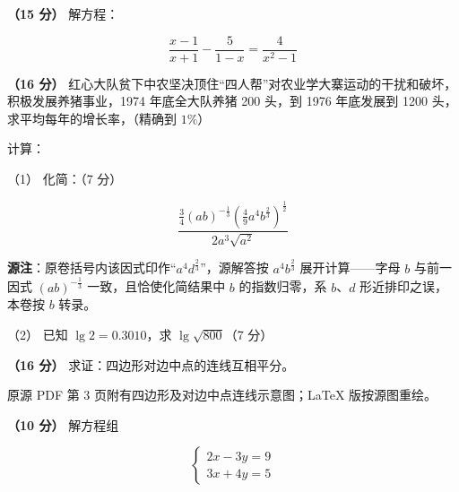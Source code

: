\begin{question}
\textbf{（15 分）} 解方程：

\nopagebreak[4]
\[
\frac{x-1}{x+1}-\frac{5}{1-x}=\frac{4}{x^2-1}
\]

\end{question}
\begin{question}
\textbf{（16 分）} 红心大队贫下中农坚决顶住“四人帮”对农业学大寨运动的干扰和破坏，积极发展养猪事业，1974 年底全大队养猪 200 头，到 1976 年底发展到 1200 头，求平均每年的增长率，（精确到 $1\%$）

\end{question}
\begin{question}
计算：

（1） 化简：（7 分）

\nopagebreak[4]
\[
\frac{\frac{3}{4}(ab)^{-\frac{1}{3}}\left(\frac{4}{9}a^4b^{\frac{2}{3}}\right)^{\frac{1}{2}}}{2a^3\sqrt{a^2}}
\]

\begin{gktip}
\textbf{源注}：原卷括号内该因式印作“$a^4d^{\frac{2}{3}}$”，源解答按 $a^4b^{\frac{2}{3}}$ 展开计算——字母 $b$ 与前一因式 $(ab)^{-\frac{1}{3}}$ 一致，且恰使化简结果中 $b$ 的指数归零，系 $b$、$d$ 形近排印之误，本卷按 $b$ 转录。
\end{gktip}

（2） 已知 $\lg 2=0.3010$，求 $\lg\sqrt{800}$（7 分）

\Needspace{0.4\textheight}
\end{question}
\begin{question}
\textbf{（16 分）} 求证：四边形对边中点的连线互相平分。

\begin{gktip}
原源 PDF 第 3 页附有四边形及对边中点连线示意图；LaTeX 版按源图重绘。
\end{gktip}
\nopagebreak[4]
\begin{center}\end{center}
\nopagebreak[4]
\end{question}
\begin{question}
\textbf{（10 分）} 解方程组

\nopagebreak[4]
\[
\begin{cases}
2x-3y=9\\
3x+4y=5
\end{cases}
\]

\Needspace{0.4\textheight}
\end{question}
